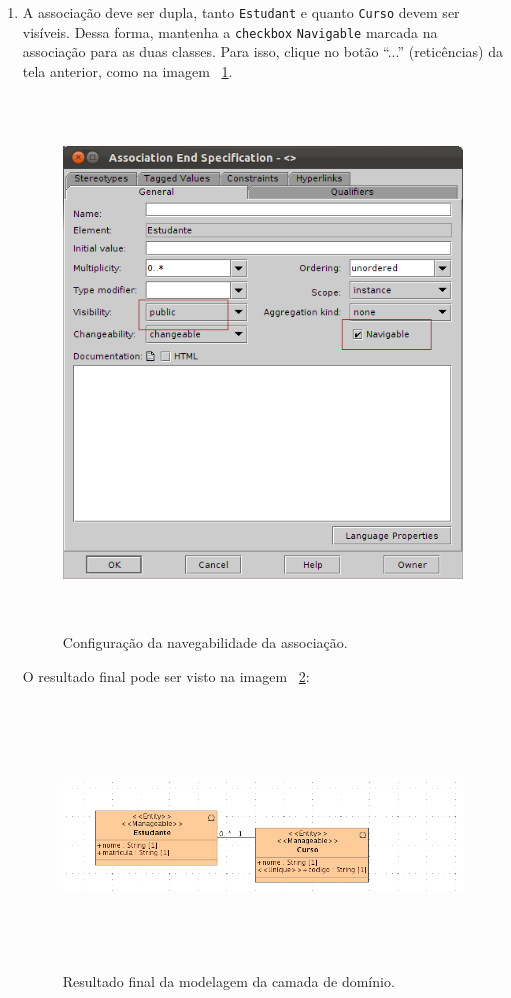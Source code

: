 \begin{enumerate}
\item A associação deve ser dupla, tanto \texttt{Estudant} e quanto
\texttt{Curso} devem ser visíveis. Dessa forma, mantenha a \texttt{checkbox}
\texttt{Navigable} marcada na associação para as duas classes. Para isso, clique
no botão “...” (reticências) da tela anterior, como na imagem
~\ref{config_navigable_associacao}.
\begin{figure}[H]
	\centering
	\includegraphics[width=350pt,height=400pt]{imgs/tutorial-mdarte-0006.png}
	\caption{Configuração da navegabilidade da associação.}
	\label{config_navigable_associacao}
\end{figure}
		
O resultado final pode ser visto na imagem ~\ref{resultado_diagrama_classe}: \hfill

\begin{figure}[H]
	\centering
	\includegraphics[width=500pt,height=200pt]{imgs/tutorial-mdarte-0007.png}
	\caption{Resultado final da modelagem da camada de domínio.}
	\label{resultado_diagrama_classe}
\end{figure}
	

\end{enumerate}
